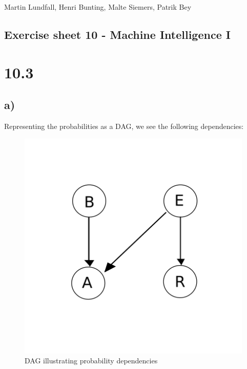 \documentclass[11pt,a4paper]{article}
\begin{document}
\noindent
Martin Lundfall, Henri Bunting, Malte Siemers, Patrik Bey
\begin{centering}
  \section*{Exercise sheet 10 - Machine Intelligence I}
  \end{centering}
\section*{10.3}
\subsection*{a)}
Representing the probabilities as a DAG, we see the following dependencies:
\begin{figure}[h]
  \centering
  \includegraphics[width=.4\textwidth]{graph}
    \caption{DAG illustrating probability dependencies}
  \end{figure}
\end{document}
